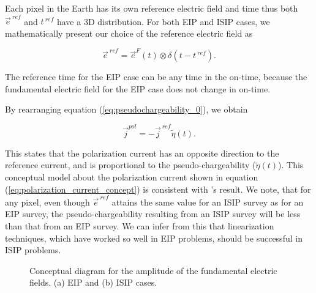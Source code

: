 \documentclass[extra,mreferee]{gji}
\renewcommand {\j}  { {\vec j} }
\newcommand {\e}  { {\vec e} }
\newcommand{\peta}{\tilde{\eta}}
\newcommand{\eref}{\e^{\ ref}}
\newcommand{\jref}{\j^{\ ref}}
\begin{document}
Each pixel in the Earth has its own reference electric field and time thus  both $\eref$ and $t^{\ ref}$ have a 3D distribution. 
For both EIP and ISIP cases, we mathematically present our choice of the reference electric field as
\begin{linenomath*}
\begin{equation}
  \eref = \e^{F}(t) \otimes \delta(t-t^{\ ref}). 
  \label{eq:reference_electricfield}
\end{equation}
\end{linenomath*}
The reference time for the EIP case can be any time in the on-time, because the fundamental electric field for the EIP case does not change in on-time. 

By rearranging equation (\ref{eq:pseudochargeability_0}), we obtain 
\begin{linenomath*}
\begin{equation}
  \j^{pol} = -\jref\peta(t). 
  \label{eq:polarization_current_concept}
\end{equation}
\end{linenomath*}
This states that the polarization current has an opposite direction to the reference current, and is proportional to the pseudo-chargeability ($\peta(t)$). 
This conceptual model about the polarization current shown in equation (\ref{eq:polarization_current_concept}) is consistent with \cite{seigel1959}'s result. We note, that for any pixel, even though  $\eref$  attains the same value for an ISIP survey as for an EIP survey, the pseudo-chargeability resulting from  an ISIP survey  will be less than that from an EIP survey. We can infer from this that  linearization techniques, which  have worked so well in EIP problems, should be successful in ISIP problems. 

\begin{figure}  
  \caption{Conceptual diagram for the amplitude of the fundamental electric fields. (a) EIP and (b) ISIP cases.}
  \label{F:DCEM_F_current}
\end{figure}   
\end{document}
